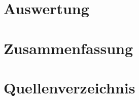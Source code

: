 \documentclass[ngerman,a4paper,parskip=half]{scrartcl}
\begin{document}
\section{Auswertung}


\section{Zusammenfassung}


\section{Quellenverzeichnis}

\end{document}
